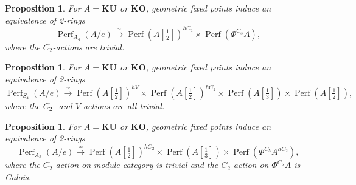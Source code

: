 \documentclass[11pt, a4paper]{article}
\newcommand{\1}{\mathbf{1}}
\newcommand{\gKU}{{\mathbf{KU}}}
\newcommand{\gKO}{{\mathbf{KO}}}
\DeclareMathOperator{\Perf}{Perf}
\theoremstyle{plain}
\newtheorem{prop}[equation]{Proposition}
\theoremstyle{definition}
\theoremstyle{remark}\numberwithin{equation}{section}
\begin{document}
\begin{prop}\label{pr:KU_decomp_A4}
    For $A=\gKU$ or $\gKO$, geometric fixed points induce an equivalence of 2-rings
    \[\Perf_{A_4}(A/e) \xrightarrow{\simeq} {\Perf(A[\tfrac{1}{2}])^{hC_2} \times \Perf(\Phi^{C_3} A)},\]
    where the $C_2$-actions are trivial.
\end{prop}

\begin{prop}\label{pr:KU_decomp_S4}
    For $A=\gKU$ or $\gKO$, geometric fixed points induce an equivalence of 2-rings
    \[\Perf_{S_4}(A/e) \xrightarrow{\simeq} {\Perf(A[\tfrac{1}{2}])^{hV} \times \Perf(A[\tfrac{1}{2}])^{hC_2} \times \Perf(A[\tfrac{1}{3}])  \times \Perf(A[\tfrac{1}{2}])},\]
    where the $C_2$- and $V$-actions are all trivial.
\end{prop}

\begin{prop}\label{pr:KU_decomp_A5}
    For $A=\gKU$ or $\gKO$, geometric fixed points induce an equivalence of 2-rings
    \[\Perf_{A_5}(A/e) \xrightarrow{\simeq} {\Perf(A[\tfrac{1}{2}])^{hC_2} \times \Perf(A[\tfrac{1}{3}]) \times \Perf(\Phi^{C_5} A^{hC_2})},\]
    where the $C_2$-action on module category is trivial and the $C_2$-action on $\Phi^{C_5} A$ is Galois.
\end{prop}
\end{document}
